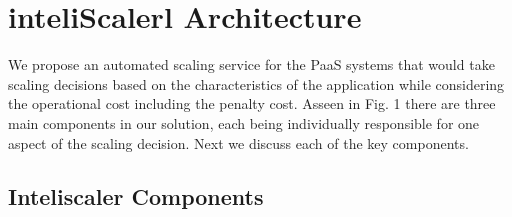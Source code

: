 \section{inteliScalerl Architecture}
We propose an automated scaling service for the PaaS systems that would take scaling decisions based on the characteristics of the application while considering the operational cost including the penalty cost. Asseen in Fig. 1 there are three main components in our solution, each being individually responsible for one aspect of the scaling decision. Next we discuss each of the key components.\\

\subsection{Inteliscaler Components}